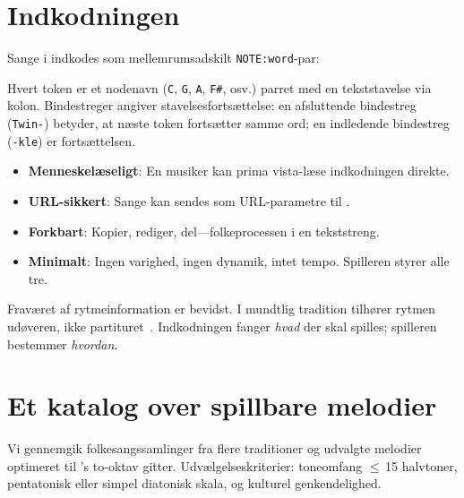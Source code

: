 \documentclass[11pt]{article}
\begin{document}
\section{Indkodningen}

Sange i \np{} indkodes som mellemrumsadskilt \texttt{NOTE:word}-par:


Hvert token er et nodenavn (\texttt{C}, \texttt{G}, \texttt{A}, \texttt{F\#}, osv.) parret med en tekststavelse via kolon. Bindestreger angiver stavelsesfortsættelse: en afsluttende bindestreg (\texttt{Twin-}) betyder, at næste token fortsætter samme ord; en indledende bindestreg (\texttt{-kle}) er fortsættelsen.

\begin{card}
\begin{itemize}
  \item \textbf{Menneskelæseligt}: En musiker kan prima vista-læse indkodningen direkte.
  \item \textbf{URL-sikkert}: Sange kan sendes som URL-parametre til \np{}.
  \item \textbf{Forkbart}: Kopier, rediger, del---folkeprocessen i en tekststreng.
  \item \textbf{Minimalt}: Ingen varighed, ingen dynamik, intet tempo. Spilleren styrer alle tre.
\end{itemize}
\end{card}

Fraværet af rytmeinformation er bevidst. I mundtlig tradition tilhører rytmen udøveren, ikke partituret~\citep{lomax1968folk}. Indkodningen fanger \emph{hvad} der skal spilles; spilleren bestemmer \emph{hvordan}.

\section{Et katalog over spillbare melodier}

Vi gennemgik folkesangssamlinger fra flere traditioner og udvalgte melodier optimeret til \np{}'s to-oktav gitter. Udvælgelseskriterier: toneomfang $\leq$\,15 halvtoner, pentatonisk eller simpel diatonisk skala, og kulturel genkendelighed.
\end{document}
